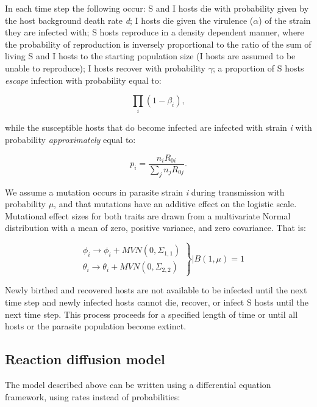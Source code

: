 In each time step the following occur: S and I hosts die with probability given by the host background death rate \emph{d}; I hosts die given the virulence ($\alpha$) of the strain they are infected with; S hosts reproduce in a density dependent manner, where the probability of reproduction is inversely proportional to the ratio of the sum of living S and I hosts to the starting population size (I hosts are assumed to be unable to reproduce); I hosts recover with probability $\gamma$; a proportion of S hosts \emph{escape} infection with probability equal to:

\begin{equation*}
\prod_{i} (1 - \beta_{i}),
\end{equation*}

\noindent while the susceptible hosts that do become infected are infected with strain \emph{i} with probability \emph{approximately} equal to:

\begin{equation*}
p_{i} = \frac{n_{i}R_{0i}}{\sum_{j}n_{j}R_{0j}}.
\end{equation*}

\noindent We assume a mutation occurs in parasite strain \emph{i} during transmission with probability $\mu$, and that mutations have an additive effect on the logistic scale. Mutational effect sizes for both traits are drawn from a multivariate Normal distribution with a mean of zero, positive variance, and zero covariance. That is:

\begin{equation*}
\left.\begin{matrix}
 & \phi_{i} \rightarrow \phi_{i} + MVN(0, \Sigma_{1,1})  \\ 
 & \theta_{i} \rightarrow \theta_{i} + MVN(0, \Sigma_{2,2}) 
\end{matrix}\right\} | B(1, \mu) = 1
\end{equation*}

Newly birthed and recovered hosts are not available to be infected until the next time step and newly infected hosts cannot die, recover, or infect S hosts until the next time step. This process proceeds for a specified length of time or until all hosts or the parasite population become extinct. 

\subsection*{Reaction diffusion model}

The model described above can be written using a differential equation framework, using rates instead of probabilities:

